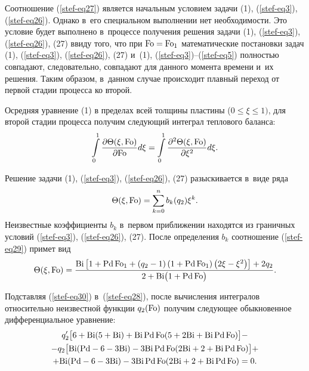 Соотношение (\ref{stef-eq27}) является начальным условием задачи (1), (\ref{stef-eq3}), (\ref{stef-eq26}). Однако в~его специальном выполнении нет необходимости. Это условие будет выполнено в~процессе получения решения задачи (1), (\ref{stef-eq3}), (\ref{stef-eq26}), (27) ввиду того, что при 
${\rm Fo}={\rm Fo}_1 $ математические постановки задач (1), (\ref{stef-eq3}), (\ref{stef-eq26}), (27) и~(1), (\ref{stef-eq3})--(\ref{stef-eq5}) полностью совпадают, следовательно, совпадают для данного момента 
времени и~их решения. Таким образом, в~данном случае происходит плавный 
переход от первой стадии процесса ко второй.

Осредняя уравнение (1) в пределах всей толщины пластины ($0\leqslant \xi 
\leqslant 1)$, для второй стадии процесса получим следующий интеграл 
теплового баланса:
\begin{equation}
\label{stef-eq28}
\int\limits_0^1 {\frac{\partial \Theta (\xi , {\rm Fo})}{\partial {\rm Fo}}d\xi } 
=\int\limits_0^1 {\frac{\partial ^2\Theta (\xi , {\rm Fo})}{\partial \xi ^2}} 
d\xi .
\end{equation}

Решение задачи (1), (\ref{stef-eq3}), (\ref{stef-eq26}), (27) разыскивается в~виде ряда
\begin{equation}
\label{stef-eq29}
\Theta (\xi, {\rm Fo})=\sum\limits_{k=0}^n b_k (q_2 )\xi ^k .
\end{equation}
Неизвестные коэффициенты $b_k $ в~первом приближении находятся из граничных 
условий (\ref{stef-eq3}), (\ref{stef-eq26}), (27). После определения $b_k $ соотношение (\ref{stef-eq29}) примет 
вид
\begin{equation}
\label{stef-eq30}
\Theta ( \xi,  {\rm Fo} )=
\frac{{\rm Bi}\left[ 1+{\rm Pd}\,{\rm Fo}_1 +\left( q_2 -1 \right)
\left( 1+{\rm Pd}\,{\rm Fo}_1  \right)
\left( 2\xi -\xi^2 \right)\right]+2q_2 }
{2+{\rm Bi}\bigl( 1+{\rm Pd}\, {\rm Fo} \bigr)}.
\end{equation}

Подставляя (\ref{stef-eq30}) в~(\ref{stef-eq28}), после вычисления интегралов относительно неизвестной 
функции $q_2 ({\rm Fo})$ получим следующее обыкновенное 
дифференциальное уравнение:
\begin{multline}
\label{stef-eq31}
q'_2 \bigl[ 
6+{\rm Bi}(5+{\rm Bi})+
{\rm Bi}\,{\rm Pd}\,{\rm Fo}( 5+2{\rm Bi}+{\rm Bi}\,{\rm Pd}\,{\rm Fo}) 
\bigr]-
\\
-q_2 \bigl[ 
{\rm Bi}({\rm Pd}-6-3{\rm Bi}) -
3{\rm Bi}\,{\rm Pd}\, {\rm Fo}( 2{\rm Bi}+2+{\rm Bi}\,{\rm Pd}\,{\rm Fo}) \bigr]+
\\
+
{\rm Bi}({\rm Pd}-6-3{\rm Bi})- 
 3{\rm Bi}\,{\rm Pd}\,{\rm Fo}( 
2{\rm Bi}+2+{\rm Bi}\, {\rm Pd}\, {\rm Fo} )=0. 
\end{multline}



